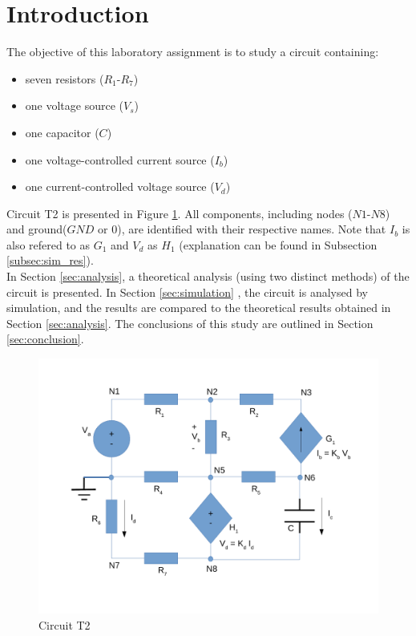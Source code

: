 
\section{Introduction}
\label{sec:introduction}


The objective of this laboratory assignment is to study a circuit containing:
\begin{itemize}
	\item seven resistors ($R_1$-$R_7$)
	\item one voltage source ($V_s$) %
	\item one capacitor ($C$)
	\item one voltage-controlled current source ($I_b$)
	\item one current-controlled voltage source ($V_d$)
\end{itemize}


Circuit T2 is presented in Figure \ref{fig:Desenho_t2}. All components, including nodes
($N1$-$N8$) and ground($GND$ or $0$), are identified with their respective names. Note
that $I_b$ is also refered to as $G_1$ and $V_d$ as $H_1$ (explanation can be found in 
Subsection \ref{subsec:sim_res}). \\

In Section \ref{sec:analysis}, a theoretical analysis (using two distinct methods) of
the circuit is presented. In Section \ref{sec:simulation} , the circuit is analysed by
simulation, and the results are compared to the theoretical results obtained in Section
\ref{sec:analysis}. The conclusions of this study are outlined in Section \ref{sec:conclusion}.


\begin{figure}[ht]
	\centering
	\includegraphics[width=0.85\linewidth]{dsnh_t2.pdf}
	\caption{Circuit T2}
\label{fig:Desenho_t2}
\end{figure}

